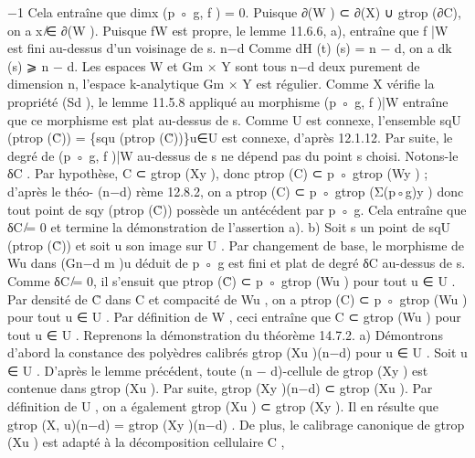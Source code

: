 \documentclass[
  10pt,
]{article}
\newenvironment{Shaded}{}{}
\newcommand{\NormalTok}[1]{#1}
\begin{document}
\begin{Shaded}
\begin{Highlighting}[]
\NormalTok{                                                                      −1}
\NormalTok{Cela entraîne que dimx (p ◦ g, f ) = 0. Puisque ∂(W ) ⊂ ∂(X) ∪ gtrop     (∂C), on a x ̸∈ ∂(W ).}
\NormalTok{Puisque fW est propre, le lemme 11.6.6, a), entraîne que f |W est fini au{-}dessus d’un}
\NormalTok{voisinage de s.}
\NormalTok{                                                                            n−d}
\NormalTok{   Comme dH (t) (s) = n − d, on a dk (s) ⩾ n − d. Les espaces W et Gm           × Y sont tous}
\NormalTok{                                                             n−d}
\NormalTok{deux purement de dimension n, l’espace k{-}analytique Gm × Y est régulier. Comme X}
\NormalTok{vérifie la propriété (Sd ), le lemme 11.5.8 appliqué au morphisme (p ◦ g, f )|W entraîne que}
\NormalTok{ce morphisme est plat au{-}dessus de s.}
\NormalTok{   Comme U est connexe, l’ensemble sqU (ptrop (C̊)) = \{squ (ptrop (C̊))\}u∈U est connexe,}
\NormalTok{d’après 12.1.12. Par suite, le degré de (p ◦ g, f )|W au{-}dessus de s ne dépend pas du}
\NormalTok{point s choisi. Notons{-}le δC .}
\NormalTok{   Par hypothèse, C ⊂ gtrop (Xy ), donc ptrop (C) ⊂ p ◦ gtrop (Wy ) ; d’après le théo{-}}
\NormalTok{                                             (n−d)}
\NormalTok{rème 12.8.2, on a ptrop (C) ⊂ p ◦ gtrop (Σ(p◦g)y ) donc tout point de sqy (ptrop (C̊)) possède}
\NormalTok{un antécédent par p ◦ g. Cela entraîne que δC ̸= 0 et termine la démonstration de}
\NormalTok{l’assertion a).}
\NormalTok{   b) Soit s un point de sqU (ptrop (C̊)) et soit u son image sur U . Par changement de base,}
\NormalTok{le morphisme de Wu dans (Gn−d     m )u déduit de p ◦ g est fini et plat de degré δC au{-}dessus}
\NormalTok{de s.}
\NormalTok{   Comme δC ̸= 0, il s’ensuit que ptrop (C̊) ⊂ p ◦ gtrop (Wu ) pour tout u ∈ U . Par densité}
\NormalTok{de C̊ dans C et compacité de Wu , on a ptrop (C) ⊂ p ◦ gtrop (Wu ) pour tout u ∈ U . Par}
\NormalTok{définition de W , ceci entraîne que C ⊂ gtrop (Wu ) pour tout u ∈ U .}
\NormalTok{  Reprenons la démonstration du théorème 14.7.2.}
\NormalTok{  a) Démontrons d’abord la constance des polyèdres calibrés gtrop (Xu )(n−d) pour u ∈ U .}
\NormalTok{  Soit u ∈ U .}
\NormalTok{  D’après le lemme précédent, toute (n − d){-}cellule de gtrop (Xy ) est contenue}
\NormalTok{dans gtrop (Xu ). Par suite, gtrop (Xy )(n−d) ⊂ gtrop (Xu ). Par définition de U , on a}
\NormalTok{également gtrop (Xu ) ⊂ gtrop (Xy ). Il en résulte que gtrop (X, u)(n−d) = gtrop (Xy )(n−d) .}
\NormalTok{  De plus, le calibrage canonique de gtrop (Xu ) est adapté à la décomposition cellulaire C ,}

\end{Highlighting}
\end{Shaded}
\end{document}
